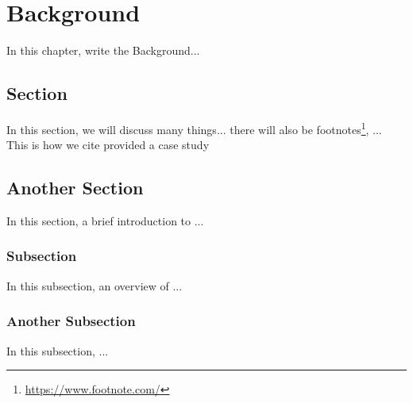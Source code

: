 \chapter{Background}
\label{cha:bg}
\vspace{0.4 cm}

In this chapter, write the Background...


\section{Section}
\label{sec:data}
\vspace{0.2 cm}

In this section, we will discuss many things... there will also be footnotes\footnote{ \url{https://www.footnote.com/} }, ...
This is how we cite\cite{Nguyen2019} provided a case study

\section{Another Section}
\label{sec:timeseries}
\vspace{0.2 cm}

In this section, a brief introduction to ... 

\vspace{0.1 cm}
\subsection{Subsection}
\label{sec:transformers}
\vspace{0.1 cm}

In this subsection, an overview of ...

\vspace{0.1 cm}
\subsection{Another Subsection}
\label{sec:automl}
\vspace{0.1 cm}

In this subsection, ...